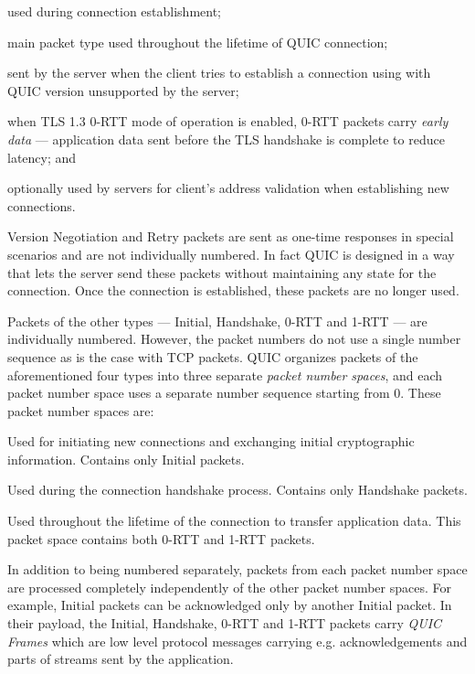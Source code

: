 \begin{enumerate}

   used during connection establishment;

   main packet type used throughout the lifetime of QUIC connection;

   sent by the server when the client tries to establish a connection
  using with QUIC version unsupported by the server;

   when TLS 1.3 0-RTT mode of operation is enabled, 0-RTT packets carry \textit{early
  data} --- application data sent before the TLS handshake is complete to reduce latency; and

   optionally used by servers for client's address validation when establishing new
  connections.

\end{enumerate}

Version Negotiation and Retry packets are sent as one-time responses in special scenarios and are
not individually numbered. In fact QUIC is designed in a way that lets the server send these packets
without maintaining any state for the connection. Once the connection is established, these packets
are no longer used.

Packets of the other types --- Initial, Handshake, 0-RTT and 1-RTT --- are individually numbered.
However, the packet numbers do not use a single number sequence as is the case with TCP packets.
QUIC organizes packets of the aforementioned four types into three separate \textit{packet number
  spaces}, and each packet number space uses a separate number sequence starting from 0. These
packet number spaces are:

\begin{enumerate}

   Used for initiating new connections and exchanging initial cryptographic
  information. Contains only Initial packets.

   Used during the connection handshake process. Contains only Handshake packets.

   Used throughout the lifetime of the connection to transfer application data.
  This packet space contains both 0-RTT and 1-RTT packets.

\end{enumerate}

In addition to being numbered separately, packets from each packet number space are processed
completely independently of the other packet number spaces. For example, Initial packets can be
acknowledged only by another Initial packet. In their payload, the Initial, Handshake, 0-RTT and
1-RTT packets carry \textit{QUIC Frames} which are low level protocol messages carrying e.g.
acknowledgements and parts of streams sent by the application.

